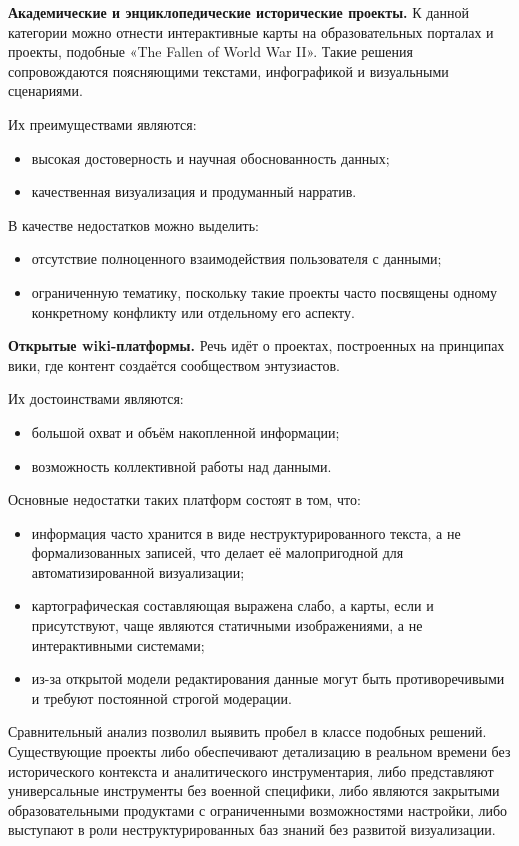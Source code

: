 \textbf{Академические и энциклопедические исторические проекты.} К данной категории можно отнести интерактивные карты на образовательных порталах и проекты, подобные «The Fallen of World War II». Такие решения сопровождаются поясняющими текстами, инфографикой и визуальными сценариями.

Их преимуществами являются:
\begin{itemize}
\item высокая достоверность и научная обоснованность данных;
\item качественная визуализация и продуманный нарратив.
\end{itemize}

В качестве недостатков можно выделить:
\begin{itemize}
\item отсутствие полноценного взаимодействия пользователя с данными;
\item ограниченную тематику, поскольку такие проекты часто посвящены одному конкретному конфликту или отдельному его аспекту.
\end{itemize}

\textbf{Открытые wiki-платформы.} Речь идёт о проектах, построенных на принципах вики, где контент создаётся сообществом энтузиастов.

Их достоинствами являются:
\begin{itemize}
\item большой охват и объём накопленной информации;
\item возможность коллективной работы над данными.
\end{itemize}

Основные недостатки таких платформ состоят в том, что:
\begin{itemize}
\item информация часто хранится в виде неструктурированного текста, а не формализованных записей, что делает её малопригодной для автоматизированной визуализации;
\item картографическая составляющая выражена слабо, а карты, если и присутствуют, чаще являются статичными изображениями, а не интерактивными системами;
\item из-за открытой модели редактирования данные могут быть противоречивыми и требуют постоянной строгой модерации.
\end{itemize}

Сравнительный анализ позволил выявить пробел в классе подобных решений. Существующие проекты либо обеспечивают детализацию в реальном времени без исторического контекста и аналитического инструментария, либо представляют универсальные инструменты без военной специфики, либо являются закрытыми образовательными продуктами с ограниченными возможностями настройки, либо выступают в роли неструктурированных баз знаний без развитой визуализации.

